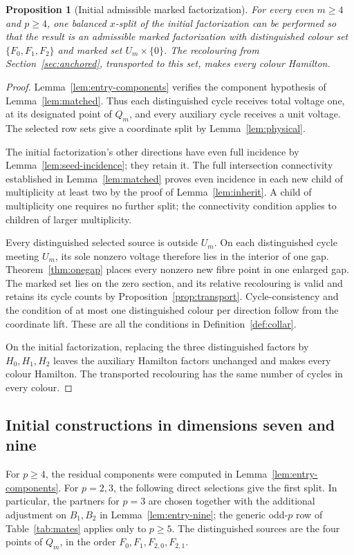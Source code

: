 \documentclass[11pt,reqno]{amsart}
\numberwithin{equation}{section}
\newtheorem{proposition}[theorem]{Proposition}
\theoremstyle{definition}
\theoremstyle{remark}
\begin{document}
\begin{proposition}[Initial admissible marked factorization]\label{prop:entry}
For every even $m\ge4$ and $p\ge4$, one balanced $x$-split of the initial factorization can be
performed so that the result is an admissible marked factorization with distinguished colour set
$\{F_0,F_1,F_2\}$ and marked set $U_m\times\{0\}$. The recolouring from
Section~\ref{sec:anchored}, transported to this set, makes every colour Hamilton.
\end{proposition}
\begin{proof}
Lemma~\ref{lem:entry-components} verifies the component hypothesis of
Lemma~\ref{lem:matched}. Thus each distinguished cycle receives total voltage one,
at its designated point of $Q_m$, and every auxiliary cycle receives a unit
voltage. The selected row sets give a coordinate split by
Lemma~\ref{lem:physical}.

The initial factorization's other directions have even full incidence by
Lemma~\ref{lem:seed-incidence}; they retain it. The full intersection connectivity established in
Lemma~\ref{lem:matched} proves even incidence in each new child of multiplicity at least two by the proof of Lemma~\ref{lem:inherit}. A child of multiplicity one requires no further split; the connectivity
condition applies to children of larger multiplicity.

Every distinguished selected source is outside $U_m$. On each distinguished cycle meeting
$U_m$, its sole nonzero voltage therefore lies in the interior of one gap.
Theorem~\ref{thm:onegap} places every nonzero new fibre point in one enlarged
gap. The marked set lies on the zero section, and its relative recolouring is
valid and retains its cycle counts by Proposition~\ref{prop:transport}.
Cycle-consistency and the condition of at most one distinguished colour per direction follow from the coordinate
lift. These are all the conditions in Definition~\ref{def:collar}.

On the initial factorization, replacing the three distinguished factors by $H_0,H_1,H_2$ leaves the
auxiliary Hamilton factors unchanged and makes every colour Hamilton. The
transported recolouring has the same number of cycles in every colour.
\end{proof}

\subsection{Initial constructions in dimensions seven and nine}
For $p\ge4$, the residual components were computed in
Lemma~\ref{lem:entry-components}. For $p=2,3$, the following direct selections
give the first split. In particular, the partners for $p=3$ are chosen
together with the additional adjustment on $B_1,B_2$ in
Lemma~\ref{lem:entry-nine}; the generic odd-$p$ row of
Table~\ref{tab:mates} applies only to $p\ge5$.
The distinguished sources are the four points of $Q_m$,
in the order $F_0,F_1,F_{2,0},F_{2,1}$.
\end{document}
